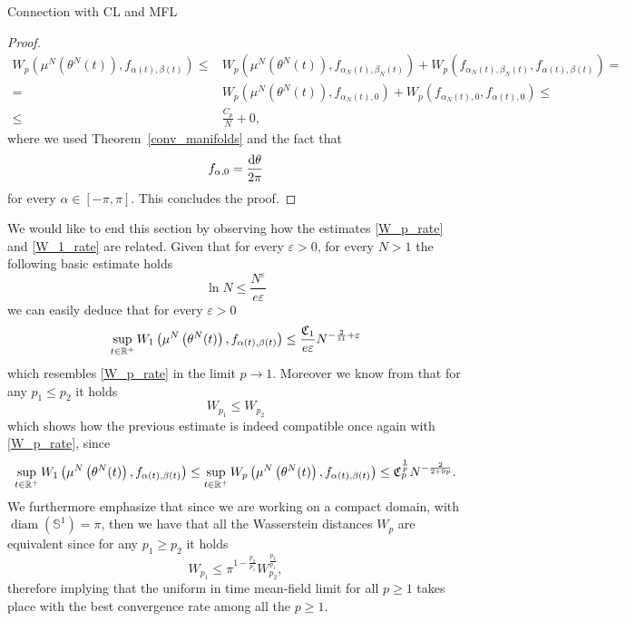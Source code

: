 \documentclass{article}
\theoremstyle{definition}
\newcommand{\R}{\mathbb{R}}
\renewcommand{\d}{\textnormal{d}}
\begin{document}
\begin{section}{Connection with CL and MFL}
\begin{proof}
\begin{align*}
    W_p\left(\mu^N\left(\theta^N(t)\right),f_{\alpha(t),\beta(t)}\right)\leq& W_p\left(\mu^N\left(\theta^N(t)\right),f_{\alpha_N(t),\beta_N(t)}\right)+W_p\left(f_{\alpha_N(t),\beta_N(t)},f_{\alpha(t),\beta(t)}\right)=\\
    =&W_p\left(\mu^N\left(\theta^N(t)\right),f_{\alpha_N(t),0}\right)+W_p\left(f_{\alpha_N(t),0},f_{\alpha(t),0}\right)\leq\\
    \leq&\frac{C_p}{N}+0,
\end{align*}
where we used Theorem~\ref{conv_manifolds} and the fact that
$$f_{\alpha,0}=\frac{\d\theta}{2\pi}$$for every $\alpha\in[-\pi,\pi]$. This concludes the proof.
\end{proof}





















We would like to end this section by observing how the estimates \eqref{W_p_rate} and \eqref{W_1_rate} are related. Given that for every $\varepsilon>0$, for every $N>1$ the following basic estimate holds
$$\ln N\leq\frac{N^\varepsilon}{e\varepsilon}$$
we can easily deduce that for every $\varepsilon>0$
$$\sup_{t\in\R^+}W_1\left(\mu^N\left(\theta^N(t)\right),f_{\alpha(t),\beta(t)}\right)\leq \frac{\frak{C}_1}{e\varepsilon}N^{-\frac{2}{11}+\varepsilon}$$
which resembles \eqref{W_p_rate} in the limit $p\rightarrow1$. Moreover we know from \cite[Chapter 7]{villani2021topics} that for any $p_1\leq p_2$ it holds
$$W_{p_1}\leq W_{p_2}$$
which shows how the previous estimate is indeed compatible once again with \eqref{W_p_rate}, since
$$\sup_{t\in\R^+}W_1\left(\mu^N\left(\theta^N(t)\right),f_{\alpha(t),\beta(t)}\right)\leq\sup_{t\in\R^+}W_p\left(\mu^N\left(\theta^N(t)\right),f_{\alpha(t),\beta(t)}\right)\leq\frak{C}_p^{\frac{1}{p}}N^{-\frac{2}{2+9p}}.$$
We furthermore emphasize that since we are working on a compact domain, with $\operatorname{diam}\left(\mathbb{S}^1\right)=\pi$, then we have that all the Wasserstein distances $W_p$ are equivalent since for any $p_1\geq p_2$ it holds
$$W_{p_1}\leq\pi^{1-\frac{p_2}{p_1}} W_{p_2}^{\frac{p_2}{p_1}},$$
therefore implying that the uniform in time mean-field limit for all $p\geq1$ takes place with the best convergence rate among all the $p\geq1$.
\end{section}
\end{document}
